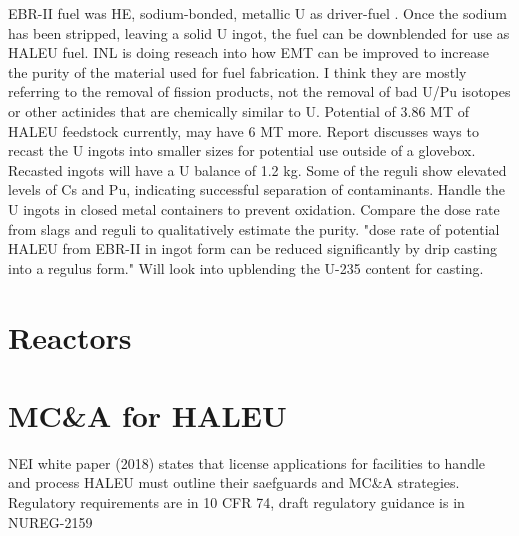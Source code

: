 \documentclass{article}
\begin{document}
EBR-II fuel was HE, sodium-bonded, metallic U as driver-fuel 
\cite{patterson_haleu_2019}. Once the sodium has been stripped, leaving 
a solid U ingot, the fuel can be downblended for use as HALEU fuel.
INL is doing reseach into how EMT can be improved to increase the purity 
of the material used for fuel fabrication. I think they are mostly 
referring to the removal of fission products, not the removal of bad 
U/Pu isotopes or other actinides that are chemically similar to U. 
Potential of 3.86 MT of HALEU feedstock currently, may have 6 MT more. 
Report discusses ways to recast the U ingots into smaller sizes for 
potential use outside of a glovebox. Recasted ingots will have a U 
balance of 1.2 kg. Some of the reguli show elevated levels of Cs and 
Pu, indicating successful separation of contaminants. Handle the U 
ingots in closed metal containers to prevent oxidation. Compare the dose 
rate from slags and reguli to qualitatively estimate the purity.
"dose rate of potential HALEU from EBR-II in ingot form can be reduced 
significantly by drip casting into a regulus form." Will look into 
upblending the U-235 content for casting. 

\section{Reactors}

\section{MC\&A for HALEU}
NEI white paper (2018) states that license applications for facilities
to handle and process HALEU must outline their saefguards and MC\&A 
strategies. Regulatory requirements are in 10 CFR 74, draft regulatory 
guidance is in NUREG-2159



\end{document}
